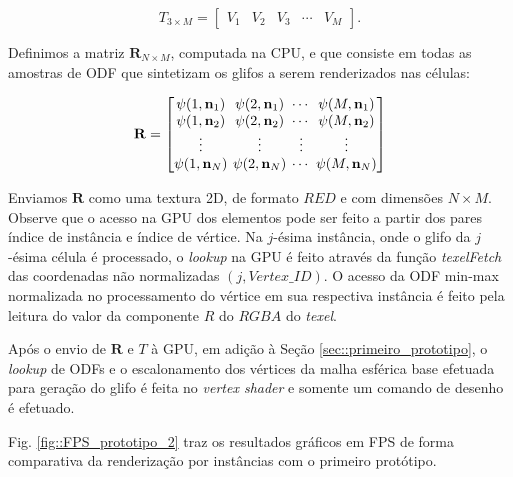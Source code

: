 \documentclass[
    12pt,                %
    oneside,            %
    a4paper,            %
    english,            %
    french,                %
    spanish,            %
    brazil                %
    ]{abntex2}
\begin{document}
\begin{equation}
\label{eq::vertices_prototipo2}
    T_{3\times M} = 
    \begin{bmatrix}
    V_1 & V_2 & V_3 & \cdots & V_M
    \end{bmatrix}
    .
\end{equation}

Definimos a matriz $\mathbf{R}_{N \times M}$, computada na CPU, e que consiste em todas as amostras de ODF que sintetizam os glifos a serem renderizados nas células:%

\begin{equation}
\label{eq::odf_prototipo2}
\mathbf{R} = 
\begingroup %
\setlength\arraycolsep{2pt}
\begin{bmatrix} 
    \psi(1, \mathbf{n}_1) &
    \psi(2, \mathbf{n}_1) & \cdots & 
    \psi(M, \mathbf{n}_1)  \\
    
    \psi(1, \mathbf{n}_2) &
    \psi(2, \mathbf{n}_2) & \cdots & 
    \psi(M, \mathbf{n}_2) \\ \vdots & \vdots & \vdots & \vdots  \\
    
    \psi(1, \mathbf{n}_N) & 
    \psi(2, \mathbf{n}_N) & \cdots & 
    \psi(M, \mathbf{n}_N)
\end{bmatrix}
\endgroup
\end{equation}

Enviamos $\mathbf{R}$ como uma textura 2D, de formato $RED$ e com dimensões $N\times M$. Observe que o acesso na GPU dos elementos pode ser feito a partir dos pares índice de instância e índice de vértice. Na $j$-ésima instância, onde o glifo da $j$-ésima célula é processado, o \textit{lookup} na GPU é feito através da função \textit{texelFetch} das coordenadas não normalizadas $(j, Vertex\_ID)$. O acesso da ODF min-max normalizada no processamento do vértice em sua respectiva instância é feito pela leitura do valor da componente $R$ do $RGBA$ do \textit{texel}.

Após o envio de $\mathbf{R}$ e $T$ à GPU, em adição à Seção \ref{sec::primeiro_prototipo}, o \textit{lookup} de ODFs e o escalonamento dos vértices da malha esférica base efetuada para geração do glifo é feita no \textit{vertex shader} e somente um comando de desenho é efetuado.

Fig. \ref{fig::FPS_prototipo_2} traz os resultados gráficos em FPS de forma comparativa da renderização por instâncias com o primeiro protótipo.
\end{document}
